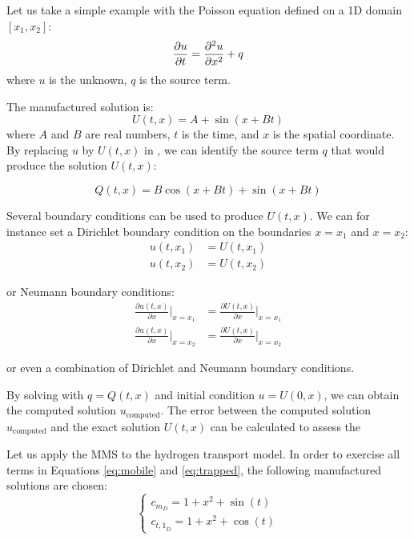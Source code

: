 Let us take a simple example with the Poisson equation defined on a 1D domain $[x_1, x_2]$:
\begin{equation}
    \frac{\partial u}{\partial t} = \frac{\partial^2 u}{\partial x^2} + q
    \labeq{poisson eq demo mms}
\end{equation}
where $u$ is the unknown, $q$ is the source term.

The manufactured solution is:
\begin{equation}
    U(t, x) = A + \sin{(x + B t)}
\end{equation}
where $A$ and $B$ are real numbers, $t$ is the time, and $x$ is the spatial coordinate.
By replacing $u$ by $U(t, x)$ in , we can identify the source term $q$ that would produce the solution $U(t, x)$:

\begin{equation}
    Q(t, x) = B \cos{(x + B t)} + \sin{(x + B t)}
\end{equation}

Several boundary conditions can be used to produce $U(t, x)$.
We can for instance set a Dirichlet boundary condition on the boundaries $x=x_1$ and $x=x_2$:
\begin{align}
    u(t, x_1) &= U(t, x_1) \\
    u(t, x_2) &= U(t, x_2)
\end{align}

or Neumann boundary conditions:
\begin{align}
    \frac{\partial u(t, x)}{\partial x}\Big | _{ x=x_1} &= \frac{\partial U(t, x)}{\partial x} \Big | _{ x=x_1} \\
    \frac{\partial u(t, x)}{\partial x}\Big | _{ x=x_2} &= \frac{\partial U(t, x)}{\partial x} \Big | _{ x=x_2}
\end{align}

or even a combination of Dirichlet and Neumann boundary conditions.

By solving  with $q = Q(t, x)$ and initial condition $u = U(0, x)$, we can obtain the computed solution $u_\mathrm{computed}$.
The error between the computed solution $u_\mathrm{computed}$ and the exact solution $U(t, x)$ can be calculated to assess the 

Let us apply the MMS to the hydrogen transport model.
In order to exercise all terms in Equations \ref{eq:mobile} and \ref{eq:trapped}, the following manufactured solutions are chosen:
\begin{equation}
    \begin{cases}
    c_{m_D} = 1 + x^2 + \sin(t) \\
    c_{{t,1}_D} = 1 + x^2 + \cos(t)
    \end{cases}
    \label{eq: manufactured solutions}
\end{equation}

